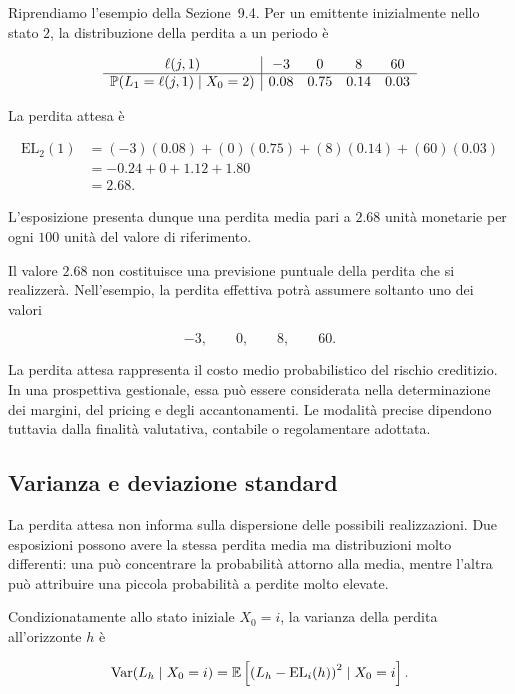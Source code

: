 Riprendiamo l'esempio della Sezione~9.4. Per un emittente inizialmente
nello stato $2$, la distribuzione della perdita a un periodo \`{e}

\[
\begin{array}{c|cccc}
\ell(j,1)
&
-3
&
0
&
8
&
60
\\
\hline
\mathbb{P}(L_1=\ell(j,1)\mid X_0=2)
&
0.08
&
0.75
&
0.14
&
0.03
\end{array}
\]

La perdita attesa \`{e}

\[
\begin{split}
\mathrm{EL}_2(1)
&=
(-3)(0.08)
+
(0)(0.75)
+
(8)(0.14)
+
(60)(0.03)
\\
&=
-0.24+0+1.12+1.80
\\
&=
2.68.
\end{split}
\]

L'esposizione presenta dunque una perdita media pari a $2.68$ unit\`{a}
monetarie per ogni $100$ unit\`{a} del valore di riferimento.

Il valore $2.68$ non costituisce una previsione puntuale della perdita
che si realizzer\`{a}. Nell'esempio, la perdita effettiva potr\`{a}
assumere soltanto uno dei valori

\[
-3,\qquad 0,\qquad 8,\qquad 60.
\]

La perdita attesa rappresenta il costo medio probabilistico del rischio
creditizio. In una prospettiva gestionale, essa pu\`{o} essere
considerata nella determinazione dei margini, del pricing e degli
accantonamenti. Le modalit\`{a} precise dipendono tuttavia dalla
finalit\`{a} valutativa, contabile o regolamentare adottata.

\subsection{Varianza e deviazione standard}

\label{subsec:cap9-varianza-perdita}

La perdita attesa non informa sulla dispersione delle possibili
realizzazioni. Due esposizioni possono avere la stessa perdita media ma
distribuzioni molto differenti: una pu\`{o} concentrare la probabilit\`{a}
attorno alla media, mentre l'altra pu\`{o} attribuire una piccola
probabilit\`{a} a perdite molto elevate.

\begin{definition}
Condizionatamente allo stato iniziale $X_0=i$, la varianza della
perdita all'orizzonte $h$ \`{e}

\[
\operatorname{Var}(L_h\mid X_0=i)
=
\mathbb{E}
\left[
\left(
L_h-\mathrm{EL}_i(h)
\right)^2
\mid X_0=i
\right].
\]
\end{definition}

